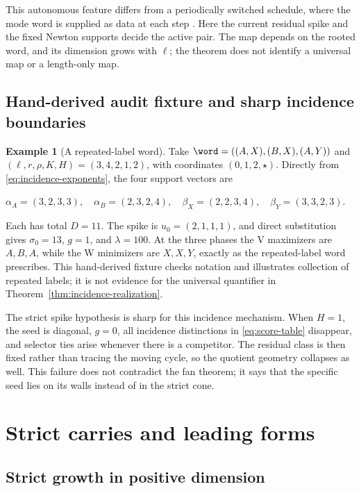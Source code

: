 \documentclass[11pt,letterpaper]{article}
\theoremstyle{definition}
\newtheorem{example}[theorem]{Example}
\theoremstyle{remark}
\numberwithin{equation}{section}
\begin{document}
This autonomous feature differs from a periodically switched schedule,
where the mode word is supplied as data at each step
\citep{ZorzenonKomendaRaisch2024}.  Here the current residual spike and the
fixed Newton supports decide the active pair.  The map depends on the rooted
word, and its dimension grows with \(\ell\); the theorem does not identify a
universal map or a length-only map.

\subsection{Hand-derived audit fixture and sharp incidence boundaries}

\begin{example}[A repeated-label word]
\label{ex:ell-three-fixture}
Take \(\word=((A,X),(B,X),(A,Y))\) and
\((\ell,r,\rho,K,H)=(3,4,2,1,2)\), with coordinates
\((0,1,2,\star)\).  Directly from \eqref{eq:incidence-exponents}, the four
support vectors are

\begin{center}
\(\alpha_A=(3,2,3,3),\quad \alpha_B=(2,3,2,4),\quad
\beta_X=(2,2,3,4),\quad \beta_Y=(3,3,2,3).\)
\end{center}

Each has total \(D=11\).  The spike is \(u_0=(2,1,1,1)\), and direct
substitution gives \(\sigma_0=13\), \(g=1\), and \(\lambda=100\).  At the three
phases the V maximizers are \(A,B,A\), while the W minimizers are
\(X,X,Y\), exactly as the repeated-label word prescribes.  This hand-derived
fixture checks notation and illustrates collection of repeated labels; it is
not evidence for the universal quantifier in
Theorem~\ref{thm:incidence-realization}.
\end{example}

The strict spike hypothesis is sharp for this incidence mechanism.  When
\(H=1\), the seed is diagonal, \(g=0\), all incidence distinctions in
\eqref{eq:score-table} disappear, and selector ties arise whenever there is
a competitor.  The residual class is then fixed rather than tracing the
moving cycle, so the quotient geometry collapses as well.  This failure does
not contradict the fan theorem; it says that the specific seed lies on its
walls instead of in the strict cone.

\section{Strict carries and leading forms}

\subsection{Strict growth in positive dimension}
\end{document}

